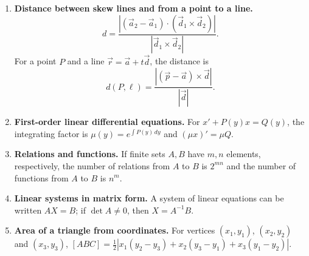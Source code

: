 \begin{enumerate}[label=\textbf{1.1.\arabic*.},ref=1.1.\arabic*]
\item \label{formula-1-1-9} \textbf{Distance between skew lines and from a point to a line.}
\begin{equation*}\tag{1.1.9.1}
d=\frac{|(\vec a_2-\vec a_1)\cdot(\vec d_1\times\vec d_2)|}{|\vec d_1\times\vec d_2|}.
\end{equation*}
For a point $P$ and a line $\vec r=\vec a+t\vec d$, the distance is
\begin{equation*}\tag{1.1.9.2}
d(P,\ell)=\frac{|(\vec p-\vec a)\times\vec d|}{|\vec d|}.
\end{equation*}
\item \label{formula-1-1-10} \textbf{First-order linear differential equations.} For $x'+P(y)x=Q(y)$, the integrating factor is $\mu(y)=e^{\int P(y)\,dy}$ and $(\mu x)'=\mu Q$.
\item \label{formula-1-1-11} \textbf{Relations and functions.} If finite sets $A,B$ have $m,n$ elements, respectively, the number of relations from $A$ to $B$ is $2^{mn}$ and the number of functions from $A$ to $B$ is $n^m$.
\item \label{formula-1-1-12} \textbf{Linear systems in matrix form.} A system of linear equations can be written $AX=B$; if $\det A\ne0$, then $X=A^{-1}B$.

\item \label{formula-1-1-13} \textbf{Area of a triangle from coordinates.} For vertices $(x_1,y_1)$, $(x_2,y_2)$ and $(x_3,y_3)$, $[ABC]=\frac12|x_1(y_2-y_3)+x_2(y_3-y_1)+x_3(y_1-y_2)|$.
\end{enumerate}
